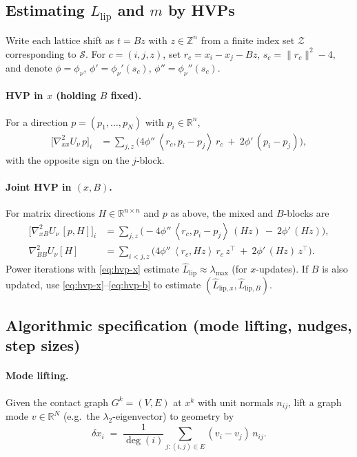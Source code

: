 \documentclass[11pt]{article}
\theoremstyle{remark}
\theoremstyle{definition}
\newcommand{\R}{\mathbb{R}}
\newcommand{\Z}{\mathbb{Z}}
\newcommand{\inner}[2]{\left\langle #1, #2 \right\rangle}
\newcommand{\Llip}{L_{\text{lip}}}
\newcommand{\Llipx}{L_{\text{lip},x}}
\newcommand{\LlipB}{L_{\text{lip},B}}
\newcommand{\ShiftSet}{\mathcal{S}}            %
\begin{document}
\subsection{Estimating \texorpdfstring{$\Llip$}{L\_lip} and \texorpdfstring{$m$}{m} by HVPs}\label{sec:hvp}
Write each lattice shift as $t=Bz$ with $z\in\Z^n$ from a finite index set $\mathcal{Z}$ corresponding to $\ShiftSet$.
For $c=(i,j,z)$, set $r_c=x_i-x_j-Bz$, $s_c=\|r_c\|^2-4$, and denote $\phi=\phi_\nu$, $\phi'=\phi_\nu'(s_c)$, $\phi''=\phi_\nu''(s_c)$.

\paragraph{HVP in $x$ (holding $B$ fixed).}
For a direction $p=(p_1,\dots,p_N)$ with $p_i\in\R^n$,
\begin{align}\label{eq:hvp-x}
\big[\nabla^2_{xx}U_\nu\,p\big]_i
&=\sum_{j,z}\Big( 4\phi''\,\inner{r_c}{p_i-p_j}\,r_c\ +\ 2\phi'\,(p_i-p_j)\Big),
\end{align}
with the opposite sign on the $j$-block.

\paragraph{Joint HVP in $(x,B)$.}
For matrix directions $H\in\R^{n\times n}$ and $p$ as above, the mixed and $B$-blocks are
\begin{align}\label{eq:hvp-xb}
\big[\nabla^2_{xB}U_\nu\,[p,H]\big]_i
&=\sum_{j,z}\Big( -4\phi''\,\inner{r_c}{p_i-p_j}\,(Hz)\ -\ 2\phi'\,(Hz)\Big),\\
\label{eq:hvp-b}
\nabla^2_{BB}U_\nu[H]
&=\sum_{i<j,z}\Big( 4\phi''\,\inner{r_c}{Hz}\,r_c\,z^\top\ +\ 2\phi'\,(Hz)\,z^\top\Big).
\end{align}
Power iterations with \eqref{eq:hvp-x} estimate $\hat \Llip\approx\lambda_{\max}$ (for $x$-updates). If $B$ is also updated, use \eqref{eq:hvp-x}--\eqref{eq:hvp-b} to estimate $(\hat \Llipx,\hat \LlipB)$.

\subsection{Algorithmic specification (mode lifting, nudges, step sizes)}\label{sec:algo}
\paragraph{Mode lifting.}
Given the contact graph $G^k=(V,E)$ at $x^k$ with unit normals $n_{ij}$, lift a graph mode $v\in\R^N$ (e.g.\ the $\lambda_2$-eigenvector) to geometry by
\begin{equation}\label{eq:lift}
\delta x_i \;=\; \frac{1}{\deg(i)} \sum_{j:(i,j)\in E} (v_i - v_j)\, n_{ij}.
\end{equation}
\end{document}
